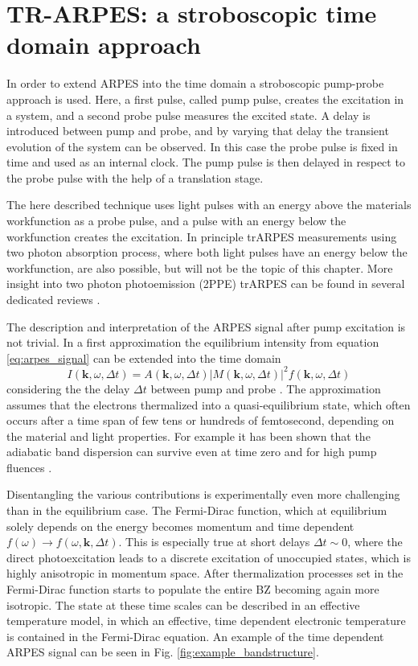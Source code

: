 \section{TR-ARPES: a stroboscopic time domain approach}

In order to extend ARPES into the time domain a stroboscopic pump-probe approach is used.
Here, a first pulse, called pump pulse, creates the excitation in a system, and a second probe pulse measures the excited state.
A delay is introduced between pump and probe, and by varying that delay the transient evolution of the system can be observed.
In this case the probe pulse is fixed in time and used as an internal clock.
The pump pulse is then delayed in respect to the probe pulse with the help of a translation stage.

The here described technique uses light pulses with an energy above the materials workfunction as a probe pulse, and a pulse with an energy below the workfunction creates the excitation.
In principle trARPES measurements using two photon absorption process, where both light pulses have an energy below the workfunction, are also possible, but will not be the topic of this chapter.
More insight into two photon photoemission (2PPE) trARPES can be found in several dedicated reviews \cite{damascelli_multiphoton_1996,bartoli_nonlinear_1997,hofer_time-resolved_1997,cui_transient_2014}.

The description and interpretation of the ARPES signal after pump excitation is not trivial.
In a first approximation the equilibrium intensity from equation \ref{eq:arpes_signal} can be extended into the time domain
\begin{equation}
	I(\mathbf{k}, \omega, \Delta t) = A(\mathbf{k}, \omega, \Delta t)\left|M(\mathbf{k}, \omega, \Delta t)\right|^2f(\mathbf{k}, \omega, \Delta t)
\end{equation}
considering the the delay  $\Delta t$ between pump and probe \cite{freericks_what_2021}.
The approximation assumes that the electrons thermalized into a quasi-equilibrium state, which often occurs after a time span of few tens or hundreds of femtosecond, depending on the material and light properties.
For example it has been shown that the adiabatic band dispersion can survive even at time zero and for high pump fluences \cite{boschini_time-resolved_2024,neufeld_time-_2022}.

Disentangling the various contributions is experimentally even more challenging than in the equilibrium case.
The Fermi-Dirac function, which at equilibrium solely depends on the energy becomes momentum and time dependent $f(\omega) \rightarrow f(\omega, \mathbf{k}, \Delta t)$.
This is especially true at short delays $\Delta t \sim 0$, where the direct photoexcitation leads to a discrete excitation of unoccupied states, which is highly anisotropic in momentum space.
After thermalization processes set in the Fermi-Dirac function starts to populate the entire BZ becoming again more isotropic.
The state at these time scales can be described in an effective temperature model, in which an effective, time dependent electronic temperature is contained in the Fermi-Dirac equation.
An example of the time dependent ARPES signal can be seen in Fig. \ref{fig:example_bandstructure}.

